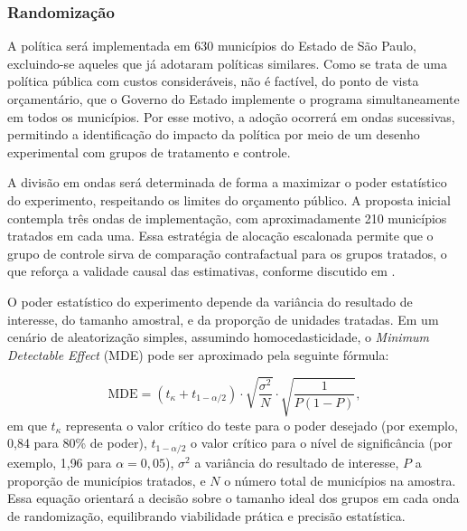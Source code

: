 \subsubsection{Randomização}

A política será implementada em 630 municípios do Estado de São Paulo, excluindo-se aqueles que já adotaram políticas similares. Como se trata de uma política pública com custos consideráveis, não é factível, do ponto de vista orçamentário, que o Governo do Estado implemente o programa simultaneamente em todos os municípios. Por esse motivo, a adoção ocorrerá em ondas sucessivas, permitindo a identificação do impacto da política por meio de um desenho experimental com grupos de tratamento e controle.

A divisão em ondas será determinada de forma a maximizar o poder estatístico do experimento, respeitando os limites do orçamento público. A proposta inicial contempla três ondas de implementação, com aproximadamente 210 municípios tratados em cada uma. Essa estratégia de alocação escalonada permite que o grupo de controle sirva de comparação contrafactual para os grupos tratados, o que reforça a validade causal das estimativas, conforme discutido em .

O poder estatístico do experimento depende da variância do resultado de interesse, do tamanho amostral, e da proporção de unidades tratadas. Em um cenário de aleatorização simples, assumindo homocedasticidade, o \textit{Minimum Detectable Effect} (MDE) pode ser aproximado pela seguinte fórmula:

\begin{equation}
    \text{MDE} = (t_{\kappa} + t_{1 - \alpha/2}) \cdot \sqrt{\frac{\sigma^2}{N}} \cdot \sqrt{\frac{1}{P(1 - P)}},
\end{equation}
em que $t_{\kappa}$ representa o valor crítico do teste para o poder desejado (por exemplo, 0{,}84 para 80\% de poder), $t_{1 - \alpha/2}$ o valor crítico para o nível de significância (por exemplo, 1{,}96 para $\alpha = 0{,}05$), $\sigma^2$ a variância do resultado de interesse, $P$ a proporção de municípios tratados, e $N$ o número total de municípios na amostra. Essa equação orientará a decisão sobre o tamanho ideal dos grupos em cada onda de randomização, equilibrando viabilidade prática e precisão estatística. 


